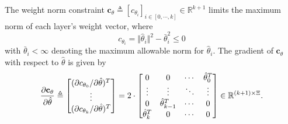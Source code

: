 \documentclass[lettersize,journal]{IEEEtran}
\begin{document}
The weight norm constraint $\mathbf{c}_{\theta}\triangleq [c_{\theta_i}]_{i\in[0,\cdots ,k]}\in\mathbb R^{k+1}$ limits the maximum norm of each layer's weight vector, where
\begin{equation}
    c_{\theta_i}=\Vert \hat\theta_i\Vert^2 -\bar\theta_i^2 \le 0
    \label{eq. cstr weight ball}
\end{equation}
with $\bar\theta_i<\infty$ denoting the maximum allowable norm for $\hat\theta_i$. 
The gradient of $\mathbf{c}_\theta$ with respect to $\hat\theta$ is given by
\begin{equation}\label{eq weight norm cnst grad}
    {\partial \mathbf c_\theta \over \partial \hat\theta}
    \triangleq
    \begin{bmatrix}
        (\partial c_{\theta_0}/\partial \hat\theta)^T
        \\ 
        \vdots 
        \\
        (\partial c_{\theta_k}/\partial \hat\theta)^T
    \end{bmatrix}
    = 2\cdot 
    \begin{bmatrix}
        0&0&\cdots & \hat\theta_0^T\\
        \vdots&\vdots&\ddots&\vdots\\
        0&\hat\theta^T_{k-1}&\cdots &0\\
        \hat\theta^T_k&0&\cdots &0
    \end{bmatrix}
    \in\mathbb R^{(k+1)\times\Xi}
    .
\end{equation}

\end{document}
